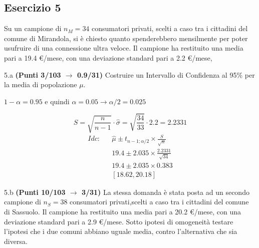 \documentclass[
  11pt,
]{book}
\theoremstyle{mytheoremstyle}
\theoremstyle{mydefstyle}
\newenvironment{sol}
  {
  \begin{tcolorbox}[enhanced,breakable,arc=0.1mm,boxrule=1pt,colback=white,colframe=iblue,
  title=\bf \fontfamily{lmss}\selectfont \hspace{.5 cm} Soluzione,drop fuzzy shadow]

}{
\end{tcolorbox}
  }
\begin{document}
\subsection{Esercizio 5}\label{esercizio-5-11}

Su un campione di \(n_M=34\) consumatori privati, scelti a caso tra i cittadini del comune di Mirandola,
si è chiesto quanto spenderebbero mensilmente per poter usufruire di una connessione ultra veloce.
Il campione ha restituito una media pari a 19.4 €/mese, con una deviazione standard pari a 2.2 €/mese,

5.a \textbf{(Punti 3/103 \(\rightarrow\) 0.9/31)} Costruire un Intervallo di Confidenza al 95\% per la media di popolazione \(\mu\).

\begin{sol}
\(1-\alpha =0.95\) e quindi \(\alpha=0.05\rightarrow \alpha/2=0.025\)

\[
      S  =\sqrt{\frac {n}{n-1}}\cdot\hat\sigma =
     \sqrt{\frac { 34 }{ 33 }}\cdot 2.2 = 2.2331 
\]
\begin{eqnarray*}
  Idc: & &  \hat\mu \pm  t_{n-1;\alpha/2} \times \frac{S}{\sqrt{n}} \\
     & &  19.4 \pm  2.035 \times \frac{ 2.2331 }{\sqrt{ 34 }} \\
     & &  19.4 \pm  2.035 \times  0.383 \\
     & & [ 18.62 ,  20.18 ]
\end{eqnarray*}

\end{sol}

5.b \textbf{(Punti 10/103 \(\rightarrow\) 3/31)} La stessa domanda è stata posta ad un secondo campione di \(n_S=38\) consumatori privati,scelti a caso tra i cittadini del comune di Sassuolo.
Il campione ha restituito una media pari a 20.2 €/mese, con una deviazione standard pari a 2.9 €/mese. Sotto ipotesi di omogeneità testare l'ipotesi che i due comuni abbiano uguale media, contro l'alternativa che sia diversa.
\end{document}

